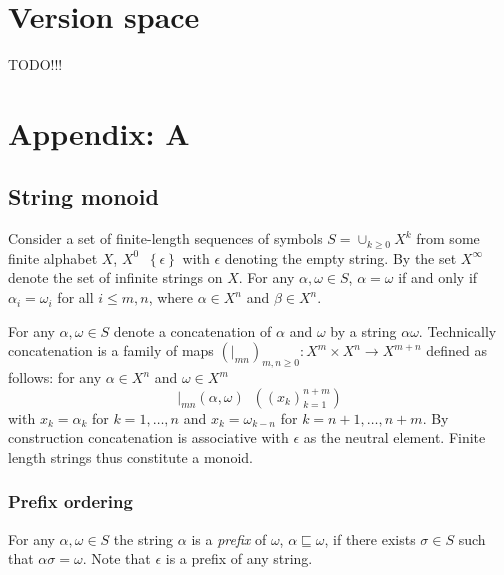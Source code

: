 \documentclass[a4paper]{article}
\newcommand{\obj}[1]{{\left\{ #1 \right \}}}
\newcommand{\brac}[1]{{\left ( #1 \right )}}
\newcommand{\defn}{\mathop{\overset{\Delta}{=}}\nolimits}
\begin{document}


\section{Version space} %
\label{sec:version_space}

TODO!!!



\section{Appendix: A} %
\label{sec:appendix_a}

\subsection{String monoid} %
\label{sub:string_monoid}

Consider a set of finite-length sequences of symbols $S=\cup_{k\geq0} X^k$ from some finite alphabet $X$, $X^0 \defn \obj{ \epsilon }$ with $\epsilon$ denoting the empty string. By the set $X^\infty$ denote the set of infinite strings on $X$. For any $\alpha, \omega\in S$, $\alpha=\omega$ if and only if $\alpha_i = \omega_i$ for all $i\leq m, n$, where $\alpha\in X^n$ and $\beta\in X^n$.

For any $\alpha,\omega\in S$ denote a concatenation of $\alpha$ and $\omega$ by a string $\alpha\omega$. Technically concatenation is a family of maps $\brac{\vert_{mn}}_{m,n\geq 0}:X^m\times X^n\to X^{m+n}$ defined as follows: for any $\alpha\in X^n$ and $\omega\in X^m$ \[\vert_{mn}(\alpha,\omega) \defn \brac{ \brac{x_k}_{k=1}^{n+m} }\] with $x_k=\alpha_k$ for $k=1,\ldots,n$ and $x_k = \omega_{k-n}$ for $k={n+1},\ldots,{n+m}$. By construction concatenation is associative with $\epsilon$ as the neutral element. Finite length strings thus constitute a monoid.

\subsubsection{Prefix ordering} %
\label{ssub:prefix_ordering}

For any $\alpha,\omega \in S$ the string $\alpha$ is a \emph{prefix} of $\omega$, $\alpha\sqsubseteq\omega$, if there exists $\sigma\in S$ such that $\alpha\sigma=\omega$. Note that $\epsilon$ is a prefix of any string.
\end{document}
